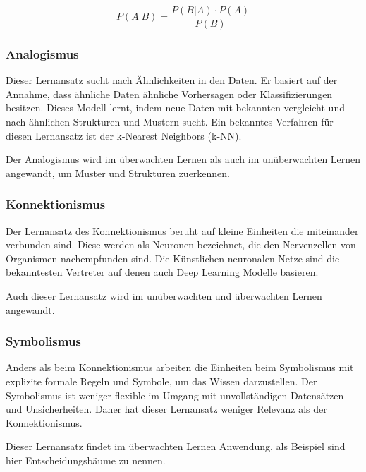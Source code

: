 \begin{equation}
	\label{eq:bayessches_theorem}
	P(A|B) = \frac{P(B|A) \cdot P(A)}{P(B)}
\end{equation}


\subsubsection{Analogismus}
Dieser Lernansatz sucht nach Ähnlichkeiten in den Daten. Er basiert auf der Annahme, dass ähnliche Daten ähnliche Vorhersagen oder Klassifizierungen besitzen. Dieses Modell lernt, indem neue Daten mit bekannten vergleicht und nach ähnlichen Strukturen und Mustern sucht. Ein bekanntes Verfahren für diesen Lernansatz ist der k-Nearest Neighbors (\acrshort{k-NN}).\vspace{0.2cm}

Der Analogismus wird im überwachten Lernen als auch im unüberwachten Lernen angewandt, um Muster und Strukturen zuerkennen.

\subsubsection{Konnektionismus}
Der Lernansatz des Konnektionismus beruht auf kleine Einheiten die miteinander verbunden sind. Diese werden als Neuronen bezeichnet, die den Nervenzellen von Organismen nachempfunden sind. Die Künstlichen neuronalen Netze sind die bekanntesten Vertreter auf denen auch Deep Learning Modelle basieren.\vspace{0.2cm}

Auch dieser Lernansatz wird im unüberwachten und überwachten Lernen angewandt.

\subsubsection{Symbolismus}
Anders als beim Konnektionismus arbeiten die Einheiten beim Symbolismus mit explizite formale Regeln und Symbole, um das Wissen darzustellen. Der Symbolismus ist weniger flexible im Umgang mit unvollständigen Datensätzen und Unsicherheiten. Daher hat dieser Lernansatz weniger Relevanz als der Konnektionismus.\vspace{0.2cm}

Dieser Lernansatz findet im überwachten Lernen Anwendung, als Beispiel sind hier Entscheidungsbäume zu nennen.


